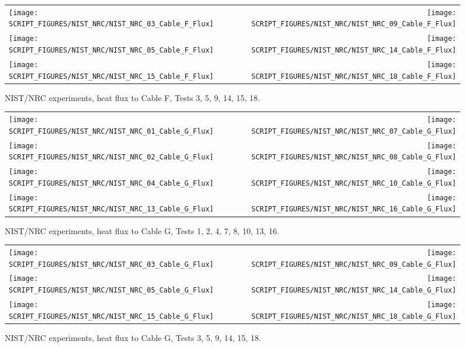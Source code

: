 \begin{figure}[p]
\begin{tabular*}{\textwidth}{l@{\extracolsep{\fill}}r}
\texttt{[image: SCRIPT\_FIGURES/NIST\_NRC/NIST\_NRC\_03\_Cable\_F\_Flux]} &
\texttt{[image: SCRIPT\_FIGURES/NIST\_NRC/NIST\_NRC\_09\_Cable\_F\_Flux]} \\
\texttt{[image: SCRIPT\_FIGURES/NIST\_NRC/NIST\_NRC\_05\_Cable\_F\_Flux]} &
\texttt{[image: SCRIPT\_FIGURES/NIST\_NRC/NIST\_NRC\_14\_Cable\_F\_Flux]} \\
\texttt{[image: SCRIPT\_FIGURES/NIST\_NRC/NIST\_NRC\_15\_Cable\_F\_Flux]} &
\texttt{[image: SCRIPT\_FIGURES/NIST\_NRC/NIST\_NRC\_18\_Cable\_F\_Flux]}
\end{tabular*}
\caption[NIST/NRC experiments, heat flux to Cable F, Tests 3, 5, 9, 14, 15, 18]
{NIST/NRC experiments, heat flux to Cable F, Tests 3, 5, 9, 14, 15, 18.}
\label{NIST_NRC_Cable_F_Flux_Open}
\end{figure}

\begin{figure}[p]
\begin{tabular*}{\textwidth}{l@{\extracolsep{\fill}}r}
\texttt{[image: SCRIPT\_FIGURES/NIST\_NRC/NIST\_NRC\_01\_Cable\_G\_Flux]} &
\texttt{[image: SCRIPT\_FIGURES/NIST\_NRC/NIST\_NRC\_07\_Cable\_G\_Flux]} \\
\texttt{[image: SCRIPT\_FIGURES/NIST\_NRC/NIST\_NRC\_02\_Cable\_G\_Flux]} &
\texttt{[image: SCRIPT\_FIGURES/NIST\_NRC/NIST\_NRC\_08\_Cable\_G\_Flux]} \\
\texttt{[image: SCRIPT\_FIGURES/NIST\_NRC/NIST\_NRC\_04\_Cable\_G\_Flux]} &
\texttt{[image: SCRIPT\_FIGURES/NIST\_NRC/NIST\_NRC\_10\_Cable\_G\_Flux]} \\
\texttt{[image: SCRIPT\_FIGURES/NIST\_NRC/NIST\_NRC\_13\_Cable\_G\_Flux]} &
\texttt{[image: SCRIPT\_FIGURES/NIST\_NRC/NIST\_NRC\_16\_Cable\_G\_Flux]}
\end{tabular*}
\caption[NIST/NRC experiments, heat flux to Cable G, Tests 1, 2, 4, 7, 8, 10, 13, 16]
{NIST/NRC experiments, heat flux to Cable G, Tests 1, 2, 4, 7, 8, 10, 13, 16.}
\label{NIST_NRC_Cable_G_Flux_Closed}
\end{figure}

\begin{figure}[p]
\begin{tabular*}{\textwidth}{l@{\extracolsep{\fill}}r}
\texttt{[image: SCRIPT\_FIGURES/NIST\_NRC/NIST\_NRC\_03\_Cable\_G\_Flux]} &
\texttt{[image: SCRIPT\_FIGURES/NIST\_NRC/NIST\_NRC\_09\_Cable\_G\_Flux]} \\
\texttt{[image: SCRIPT\_FIGURES/NIST\_NRC/NIST\_NRC\_05\_Cable\_G\_Flux]} &
\texttt{[image: SCRIPT\_FIGURES/NIST\_NRC/NIST\_NRC\_14\_Cable\_G\_Flux]} \\
\texttt{[image: SCRIPT\_FIGURES/NIST\_NRC/NIST\_NRC\_15\_Cable\_G\_Flux]} &
\texttt{[image: SCRIPT\_FIGURES/NIST\_NRC/NIST\_NRC\_18\_Cable\_G\_Flux]}
\end{tabular*}
\caption[NIST/NRC experiments, heat flux to Cable G, Tests 3, 5, 9, 14, 15, 18]
{NIST/NRC experiments, heat flux to Cable G, Tests 3, 5, 9, 14, 15, 18.}
\label{NIST_NRC_Cable_G_Flux_Open}
\end{figure}


